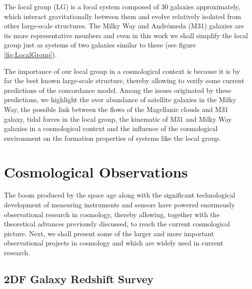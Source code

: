 The local group (LG) is a local system composed of 30 galaxies approximately, 
which interact gravitationally between them and evolve relatively isolated 
from other large-scale structures. The Milky Way and Andrómeda (M31) 
galaxies are its more representative members and even in this work we shall 
simplify the local group just as systems of two galaxies similar to these 
(see figure \ref{fig:LocalGroup}).


The importance of our local group in a cosmological context is because it
is by far the best known large-scale structure, thereby allowing to verify
some current predictions of the concordance model. Among the issues 
originated by these predictions, we highlight the over abundance of 
satellite galaxies in the Milky Way, the possible link between the flows
of the Magellanic clouds and M31 galaxy, tidal forces in the local group,
the kinematic of M31 and Milky Way galaxies in a cosmological context 
\cite{forero2013} and the influence of the cosmological environment on the
formation properties of systems like the local group.








\section{Cosmological Observations}
\label{sec:CosmologicalObservations}
	
	
The boom produced by the space age along with the significant 
technological development of measuring instruments and sensors have 
powered enormously observational research in cosmology, thereby allowing, 
together with the theoretical advances previously discussed, to reach the 
current cosmological picture. Next, we shall present some of the larger
and more important observational projects in cosmology and which are 
widely used in current research.



	\subsection*{2DF Galaxy Redshift Survey}
	\label{subsec:2DFGRS}
	
